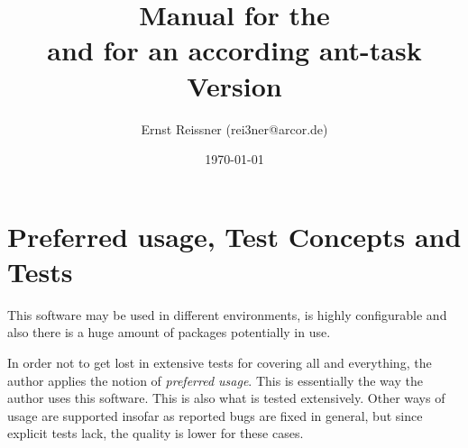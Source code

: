 \documentclass[a4paper,12pt,german,english]{book}
\title{Manual for the \artifactId{} \protect\\
  and for an according ant-task \protect\\
Version \strippedVersionID}
\author{Ernst Reissner (rei3ner@arcor.de)}
\date{\today}%
\renewcommand{\index}[1]{}
\begin{document}
\maketitle

\tableofcontents
\listoffigures
\listoftables
\lstlistoflistings%













\chapter{Preferred usage, Test Concepts and Tests}\label{chap:tests}

This software may be used in different environments, 
is highly configurable and 
also there is a huge amount of packages potentially in use. 

In order not to get lost in extensive tests for covering all and everything, 
the author applies the notion of\index{preferred usage} \emph{preferred usage}. 
This is essentially the way the author uses this software. 
This is also what is tested extensively. 
Other ways of usage are supported insofar as reported bugs are fixed in general, 
but since explicit tests lack, the quality is lower for these cases. 
\end{document}
